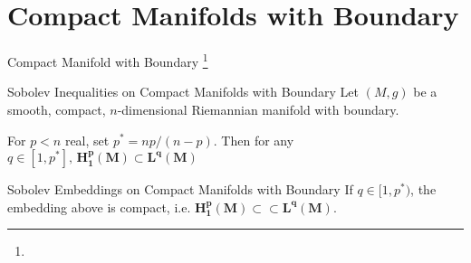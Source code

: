 \documentclass[xcolor=table,dvipsnames,svgnames,aspectratio=169,fontset=fandol]{ctexbeamer}
\begin{document}

\section{Compact Manifolds with Boundary}

\begin{frame}{Compact Manifold with Boundary \footnote{} }
  \begin{alertblock}{Sobolev Inequalities on Compact Manifolds with Boundary}
  Let $(M, g)$ be a smooth, compact, $n$-dimensional Riemannian manifold with boundary.
  
  For $p<n$ real, set $p^*=n p /(n-p)$. Then for any $q \in[1, p^*],\, \bm{H_1^p(M) \subset L^q(M)}$ 
  \end{alertblock}

  \vskip 8pt
  \begin{alertblock}{Sobolev Embeddings on Compact Manifolds with Boundary}
    If $q \in[1, p^*)$, the embedding above is compact, i.e. $\bm{H_1^p(M) \subset \subset L^q(M)}$.

  \end{alertblock}
\end{frame}


\makebottom

  

%




\end{document}
